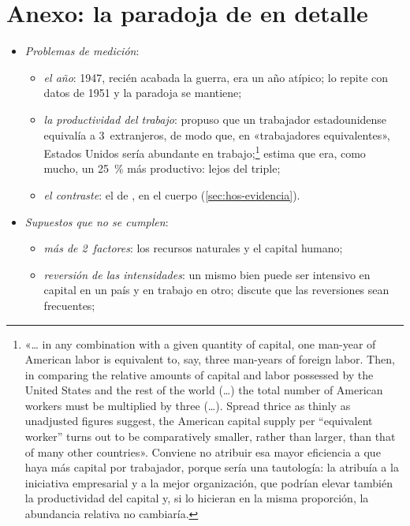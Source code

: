 \documentclass[11pt]{article}
\begin{document}
\section{Anexo: la paradoja de  en detalle}\label{anexo:leontief}

\begin{itemize}
\item \emph{Problemas de medición}:
  \begin{itemize}
  \item \emph{el año}: 1947, recién acabada la guerra, era un año atípico; \textcite{Leontief1956Factor} lo repite con datos de 1951 y la paradoja se mantiene;
  \item \emph{la productividad del trabajo}:  propuso que un trabajador estadounidense equivalía a 3~extranjeros, de modo que, en «trabajadores equivalentes», Estados Unidos sería abundante en trabajo;\footnote{«… in any combination with a given quantity of capital, one man-year of American labor is equivalent to, say, three man-years of foreign labor. Then, in comparing the relative amounts of capital and labor possessed by the United States and the rest of the world (…) the total number of American workers must be multiplied by three (…). Spread thrice as thinly as unadjusted figures suggest, the American capital supply per “equivalent worker” turns out to be comparatively smaller, rather than larger, than that of many other countries»\nocite{Leontief1953Domestic}. Conviene no atribuir esa mayor eficiencia a que haya más capital por trabajador, porque sería una tautología:  la atribuía a la iniciativa empresarial y a la mejor organización, que podrían elevar también la productividad del capital y, si lo hicieran en la misma proporción, la abundancia relativa no cambiaría.} \textcite{Kreinin1965Comparative} estima que era, como mucho, un 25~\% más productivo: lejos del triple;
  \item \emph{el contraste}: el de \textcite{Leamer1980Leontief}, en el cuerpo (\ref{sec:hos-evidencia}).
  \end{itemize}
\item \emph{Supuestos que no se cumplen}:
  \begin{itemize}
  \item \emph{más de 2~factores}: los recursos naturales\nocite{Vanek1963Natural} y el capital humano\nocite{Keesing1966Labor,Kenen1965Nature};
  \item \emph{reversión de las intensidades}: un mismo bien puede ser intensivo en capital en un país y en trabajo en otro\nocite{Minhas1962Homohypallagic}; \textcite{Leontief1964International} discute que las reversiones sean frecuentes;

\end{itemize}
\end{itemize}
\end{document}

